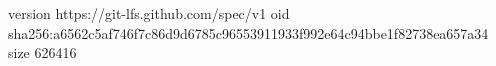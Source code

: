 version https://git-lfs.github.com/spec/v1
oid sha256:a6562c5af746f7c86d9d6785c96553911933f992e64c94bbe1f82738ea657a34
size 626416
